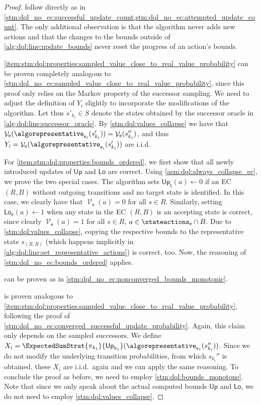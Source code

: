 \documentclass{article}
\newcommand{\intersectionSym}{\cap}
\newcommand{\intersectionBin}{\mathbin{\intersectionSym}}
\newcommand{\intersection}{\intersectionBin}
\newcommand{\States}{S}
\newcommand{\strategy}{\pi}
\DeclareMathOperator{\val}{\mathcal{V}}
\newcommand{\upperbound}{\mathsf{Up}}
\newcommand{\lowerbound}{\mathsf{Lo}}
\newcommand{\algostep}{\mathsf{t}}
\newcommand{\algoepisode}{\mathsf{e}}
\begin{document}
\begin{proof}
	 follow directly as in \cref{stm:dql_no_ec:successful_update_count,stm:dql_no_ec:attempted_update_count}.
	The only additional observation is that the algorithm never adds new actions and that the changes to the bounds outside of \cref{alg:dql:line:update_bounds} never reset the progress of an action's bounds.

	\cref{item:stm:dql:properties:sampled_value_close_to_real_value_probability} can be proven completely analogous to \cref{stm:dql_no_ec:sampled_value_close_to_real_value_probability}, since this proof only relies on the Markov property of the successor sampling.
	We need to adjust the definition of $Y_i$ slightly to incorporate the modifications of the algorithm.
	Let thus $s'_{k_i} \in \States$ denote the states obtained by the successor oracle in \cref{alg:dql:line:successor_oracle}.
	By \cref{stm:dql:values_collapse} we have that $\val_\algoepisode(\algorepresentative_{\algoepisode_i}(s'_{k_i})) = \val_\algoepisode(s''_{k_i})$, and thus $Y_i = \val_\algoepisode(\algorepresentative_{\algoepisode_i}(s'_{k_i}))$ are i.i.d.

	For \cref{item:stm:dql:properties:bounds_ordered}, we first show that all newly introduced updates of $\upperbound$ and $\lowerbound$ are correct.
	Using \cref{asm:dql:always_collapse_ec}, we prove the two special cases.
	The algorithm sets $\upperbound_\algostep(a) \gets 0$ if an EC $(R, B)$ without outgoing transitions and no target state is identified.
	In this case, we clearly have that $\val_\algoepisode(a) = 0$ for all $s \in R$.
	Similarly, setting $\lowerbound_\algoepisode(a) \gets 1$ when any state in the EC $(R, B)$ is an accepting state is correct, since clearly $\val_\algoepisode(a) = 1$ for all $s \in R$, $a \in \stateactions_\algoepisode \intersection B$.
	Due to \cref{stm:dql:values_collapse}, copying the respective bounds to the representative state $s_{(R, B)}$ (which happens implicitly in \cref{alg:dql:line:set_representative_actions}) is correct, too.
	Now, the reasoning of \cref{stm:dql_no_ec:bounds_ordered} applies.

	 can be proven as in \cref{stm:dql_no_ec:nonconverged_bounds_monotonic}.

	 is proven analogous to \cref{item:stm:dql:properties:sampled_value_close_to_real_value_probability}, following the proof of \cref{stm:dql_no_ec:converged_successful_update_probability}.
	Again, this claim only depends on the sampled successors.
	We define $X_i = \ExpectedSumStrat{\strategy_{k_1}}{\upperbound_{k_1}}(\algorepresentative_{\algoepisode_1}(s_{k_i}''))$.
	Since we do not modify the underlying transition probabilities, from which $s_{k_i}''$ is obtained, these $X_i$ are i.i.d.\ again and we can apply the same reasoning.
	To conclude the proof as before, we need to employ \cref{stm:dql:bounds_monotone}.
	Note that since we only speak about the actual computed bounds $\upperbound$ and $\lowerbound$, we do not need to employ \cref{stm:dql:values_collapse}.


\end{proof}
\end{document}
